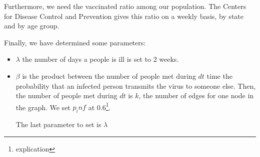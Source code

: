  Furthermore, we need the vaccinated ratio among our population. The Centers for Disease Control and Prevention gives this ratio on a weekly basis, by state and by age group.
 
 Finally, we have determined some parameters:
 \begin{itemize}
     \item $\lambda$ the number of days a people is ill is set to 2 weeks.
     \item $\beta$ is the product between the number of people met during $dt$ time the probability that an infected person transmits the virus to someone else. Then, the number of people met during $dt$ is $k$, the number of edges for one node in the graph. We set $p_inf$ at 0.6\footnote{explication}.

The last parameter to set is $\lambda$
 \end{itemize}



